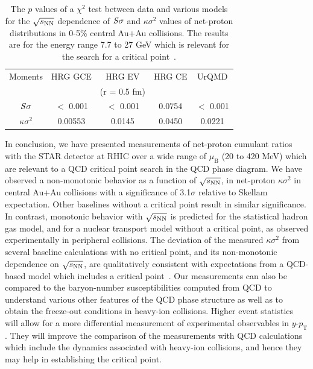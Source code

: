 \documentclass[10pt,aps,prc,twocolumn,floatfix]{revtex4-1}
\newcommand{\rootsnn} {\mbox{$\sqrt{s_{\rm NN}}$}\xspace}
\begin{document}
\begin{table}
	\caption{The $p$ values of a $\chi^2$ test between data and
          various models for the \rootsnn dependence of $\it{S}\sigma$  and
          $\kappa\sigma^{2}$  values of net-proton
          distributions in 0-5\% central Au+Au collisions. The results
          are for the energy range 7.7 to 27 GeV which is relevant
          for the search for a critical point~\cite{Bazavov:2017tot, Bazavov:2017dus}.}
	\centering   
	\begin{tabular}{|c|c|c|c|c|}
		\hline	
		Moments & HRG GCE & HRG EV & HRG CE &
                                                                  UrQMD  \\
          	 &  &  (r = 0.5 fm)&&  \\
		\hline 
 $\it{S}\sigma$ & $<$ 0.001 &  $<$ 0.001 & 0.0754 & $<$ 0.001 \\
\hline 
$\kappa\sigma^{2}$ & 0.00553& 0.0145 & 0.0450 & 0.0221\\
\hline  
	\end{tabular}
	\label{tab1}
\end{table}


In conclusion, we have presented measurements of net-proton cumulant
ratios with the STAR detector at RHIC over a wide range of $\mu_{\mathrm B}$ (20 to
420 MeV) which are relevant to a QCD
critical point search in the QCD phase diagram.
We have observed a non-monotonic behavior
as a function of \rootsnn, in net-proton $\kappa\sigma^2$ in central
Au+Au collisions with a significance of 3.1$\sigma$ relative to
Skellam expectation. Other baselines without a critical point result in similar significance.
In contrast, monotonic behavior with \rootsnn is predicted for the
statistical hadron gas model, and for a nuclear transport model
without a critical point, as observed experimentally in peripheral collisions. 
The deviation of the measured $\kappa\sigma^2$ from several baseline
calculations with no critical point, and its non-monotonic dependence on
\rootsnn, are qualitatively  consistent with expectations from a QCD-based model which
includes a critical point~\cite{Stephanov:2008qz,Stephanov:2011pb}.
Our measurements can also be compared to 
the baryon-number susceptibilities computed from QCD to understand  
various other features of the QCD phase structure as well as to obtain 
the freeze-out conditions in heavy-ion collisions.
Higher event statistics will allow for a more differential measurement of 
experimental observables in $y$-$p_{\mathrm T}$. They will improve the comparison of the 
measurements with QCD calculations which include the dynamics associated 
with heavy-ion collisions, and hence they may help in establishing the 
critical point.
\end{document}
